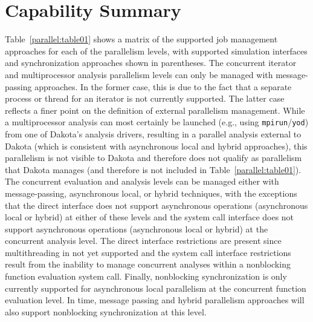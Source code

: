 \section{Capability Summary}\label{parallel:summary}


Table~\ref{parallel:table01} shows a matrix of the supported job
management approaches for each of the parallelism levels, with
supported simulation interfaces and synchronization approaches shown
in parentheses. The concurrent iterator and multiprocessor analysis
parallelism levels can only be managed with message-passing
approaches. In the former case, this is due to the fact that a
separate process or thread for an iterator is not currently supported.
The latter case reflects a finer point on the definition of external
parallelism management. While a multiprocessor analysis can most
certainly be launched (e.g., using \texttt{mpirun}/\texttt{yod}) from
one of Dakota's analysis drivers, resulting in a parallel analysis
external to Dakota (which is consistent with asynchronous local and
hybrid approaches), this parallelism is not visible to Dakota and
therefore does not qualify as parallelism that Dakota manages (and
therefore is not included in Table~\ref{parallel:table01}). The
concurrent evaluation and analysis levels can be managed either with
message-passing, asynchronous local, or hybrid techniques, with the
exceptions that the direct interface does not support asynchronous
operations (asynchronous local or hybrid) at either of these levels
and the system call interface does not support asynchronous operations
(asynchronous local or hybrid) at the concurrent analysis level. The
direct interface restrictions are present since multithreading in not
yet supported and the system call interface restrictions result from
the inability to manage concurrent analyses within a nonblocking
function evaluation system call.  Finally, nonblocking synchronization
is only currently supported for asynchronous local parallelism at the
concurrent function evaluation level.  In time, message passing and
hybrid parallelism approaches will also support nonblocking
synchronization at this level.

